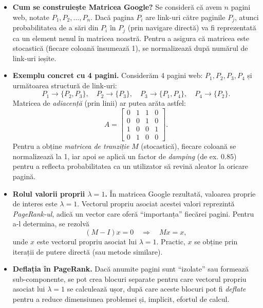 \documentclass{exam}
\begin{document}
\begin{itemize}
  \item \textbf{Cum se construiește Matricea Google?} Se consideră că avem $n$ pagini web, notate $P_1, P_2, \ldots, P_n$. Dacă pagina $P_i$ are link-uri către paginile $P_j$, atunci probabilitatea de a sări din $P_i$ în $P_j$ (prin navigare directă) va fi reprezentată ca un element nenul în matricea noastră. Pentru a asigura că matricea este stocastică (fiecare coloană însumează 1), se normalizează după numărul de link-uri ieșite.

  \item \textbf{Exemplu concret cu 4 pagini.} Considerăm 4 pagini web: $P_1, P_2, P_3, P_4$ și următoarea structură de link-uri:
  \[
    P_1 \to \{P_2, P_3\}, \quad
    P_2 \to \{P_3\}, \quad
    P_3 \to \{P_1, P_4\}, \quad
    P_4 \to \{P_2\}.
  \]
  Matricea de \emph{adiacență} (prin linii) ar putea arăta astfel:
  \[
    A = \begin{bmatrix}
    0 & 1 & 1 & 0 \\[0.3em]
    0 & 0 & 1 & 0 \\[0.3em]
    1 & 0 & 0 & 1 \\[0.3em]
    0 & 1 & 0 & 0
    \end{bmatrix}.
  \]
  Pentru a obține \emph{matricea de tranziție} $M$ (stocastică), fiecare coloană se normalizează la 1, iar apoi se aplică un factor de \emph{damping} (de ex. $0.85$) pentru a reflecta probabilitatea ca un utilizator să revină aleator la oricare pagină.

  \item \textbf{Rolul valorii proprii $\lambda=1$.} În matricea Google rezultată, valoarea proprie de interes este $\lambda=1$. Vectorul propriu asociat acestei valori reprezintă \emph{PageRank-ul}, adică un vector care oferă “importanța” fiecărei pagini. Pentru a-l determina, se rezolvă
  \[
    (M - I)x = 0 \quad \Longrightarrow \quad Mx = x,
  \]
  unde $x$ este vectorul propriu asociat lui $\lambda=1$. Practic, $x$ se obține prin iterații de putere directă (sau metode similare).

  \item \textbf{Deflația în PageRank.} Dacă anumite pagini sunt “izolate” sau formează sub-componente, se pot crea blocuri separate pentru care vectorul propriu asociat lui $\lambda=1$ se calculează ușor, după care aceste blocuri pot fi \emph{deflate} pentru a reduce dimensiunea problemei și, implicit, efortul de calcul.
\end{itemize}
\end{document}
